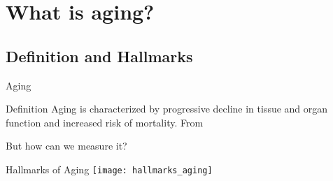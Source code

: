 \section{What is aging?}


\subsection{Definition and Hallmarks}

\begin{frame}[c]{Aging}
    \large

    \begin{block}{Definition}
        Aging is characterized by progressive decline in tissue and organ
        function and increased risk of mortality. From \cite{sen2016epigenetic}
    \end{block}
    \pause
    But how can we measure it?
\end{frame}


\begin{frame}[c]{Hallmarks of Aging}
    \texttt{[image: hallmarks\_aging]} \\
    \cite{lopez2013hallmarks}
\end{frame}


